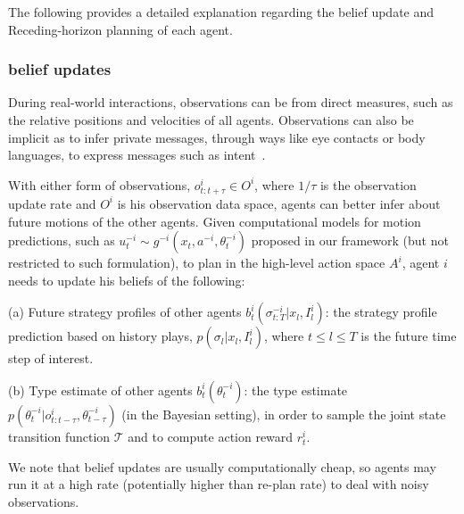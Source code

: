 \documentclass[letterpaper, 10 pt, conference]{ieeeconf}  %
\begin{document}
The following provides a detailed explanation regarding the belief update and 
Receding-horizon planning of each agent.
 
\subsubsection{belief updates}\label{sec:belief_update}
During real-world interactions, observations can be from direct measures, such as the relative positions and velocities of all agents. Observations can also be implicit as to infer private messages, through ways like eye contacts or body languages, to express messages such as intent~\cite{knepper2017implicit}.

With either form of observations, $o^i_{t:t+\tau} \in O^i$, where $1/\tau$ is the 
observation  
update rate and $O^i$ is his observation data space, agents can better infer about 
future motions of the other agents. Given computational models for motion 
predictions, such as $u^{-i}_t \sim g^{-i}(x_t,a^{-i},\theta^{-i}_t)$ proposed 
in our framework (but not restricted to such formulation), to plan in the 
high-level action space $A^i$, agent $i$ needs to update his beliefs of the 
following:

(a) Future strategy profiles of other agents $b^i_t(\sigma^{-i}_{t:T}|x_l,I^i_l)$: 
the strategy profile prediction based on history plays, $p(\sigma_l|x_l,I^i_l)$, 
where $t\leq l\leq T$ is the future time step of 
interest.

(b) Type estimate of other agents $b^i_t(\theta_t^{-i})$: 
the type estimate $p(\theta^{-i}_t|o^i_{t:t-\tau},\theta^{-i}_{t-\tau})$ (in 
the Bayesian setting), in order to sample the joint state transition function 
$\mathcal{T}$ and to compute action reward $r^i_t$.


We note that belief updates are usually computationally cheap, so agents may run it at a high rate (potentially higher than re-plan rate) to deal with noisy 
observations.
 
\end{document}
